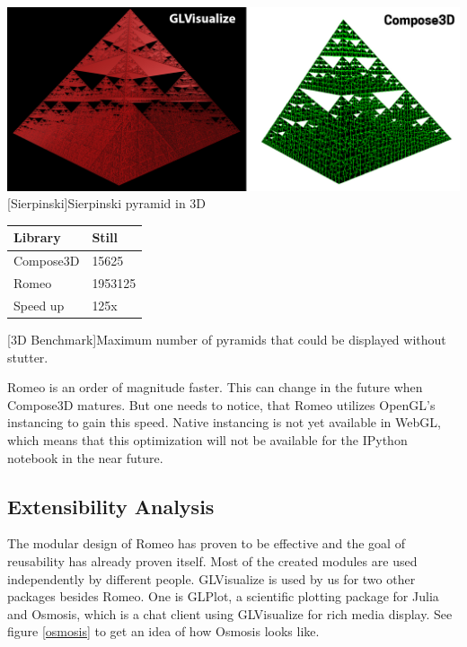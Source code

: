 \begin{minipage}{\linewidth}
    \centering
    \includegraphics[width=\linewidth]{graphics/sierpinsky.jpg}
    [Sierpinski]{Sierpinski pyramid in 3D}
    \label{fig:reactive1}
\end{minipage}
\begin{table}[htbp]
    \centering
    \begin{tabular}{l|l}
        \hline
        \textbf{Library} & \textbf{Still}\\ 
        \hline
        Compose3D        & 15625         \\
        Romeo            & 1953125       \\
        \hline
        \hline
        Speed up         & 125x          \\
    \end{tabular}
    [3D Benchmark]{Maximum number of pyramids that could be displayed without stutter.}
    \label{table:relativespeedoglw}
\end{table}

Romeo is an order of magnitude faster. This can change in the future when Compose3D matures.
But one needs to notice, that Romeo utilizes OpenGL's instancing to gain this speed. Native instancing is not yet available in WebGL, which means that this optimization will not be available for the IPython notebook in the near future.

\subsection{Extensibility Analysis}

The modular design of Romeo has proven to be effective and the goal of reusability has already proven itself.
Most of the created modules are used independently by different people.
GLVisualize is used by us for two other packages besides Romeo. 
One is GLPlot\cite{GLPlot}, a scientific plotting package for Julia and Osmosis\cite{Osmosis}, which is a chat client using GLVisualize for rich media display.
See figure \cref{osmosis} to get an idea of how Osmosis looks like.

